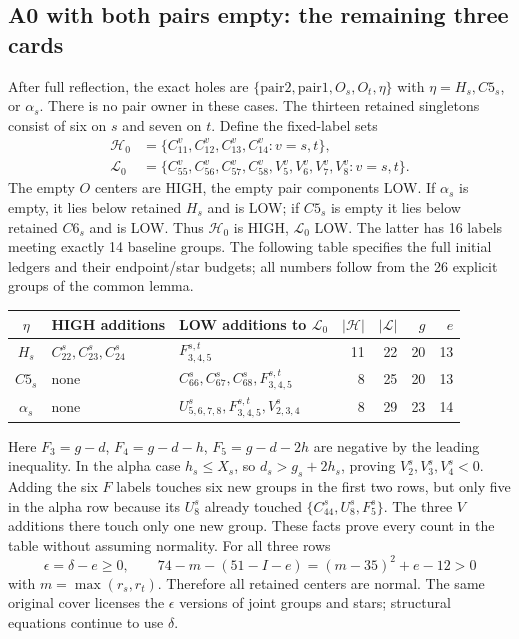 \documentclass[11pt,letterpaper]{article}
\theoremstyle{definition}\newtheorem{definition}[theorem]{Definition}
\begin{document}
\subsection{A0 with both pairs empty: the remaining three cards}
After full reflection, the exact holes are
$\{\mathrm{pair2},\mathrm{pair1},O_s,O_t,\eta\}$ with
$\eta=H_s,C5_s$, or $\alpha_s$. There is no pair owner in these cases.
The thirteen retained singletons consist of six on $s$ and seven on $t$.
Define the fixed-label sets
\[
\begin{split}
\mathcal H_0&=\{C_{11}^v,C_{12}^v,C_{13}^v,C_{14}^v:v=s,t\},\\
\mathcal L_0&=\{C_{55}^v,C_{56}^v,C_{57}^v,C_{58}^v,
                       V_5^v,V_6^v,V_7^v,V_8^v:v=s,t\}.
\end{split}
\]
The empty $O$ centers are HIGH, the empty pair components LOW.
If $\alpha_s$ is empty, it lies below retained $H_s$ and is LOW;
if $C5_s$ is empty it lies below retained $C6_s$ and is LOW.
Thus $\mathcal H_0$ is HIGH, $\mathcal L_0$ LOW. The latter has 16
labels meeting exactly 14 baseline groups. The following table specifies
the full initial ledgers and their endpoint/star budgets; all numbers
follow from the 26 explicit groups of the common lemma.
\begin{center}\small
\begin{tabular}{c|l|l|r r r r}
$\eta$&HIGH additions&LOW additions to $\mathcal L_0$&$|\mathcal H|$&$|\mathcal L|$&$g$&$e$\\\hline
$H_s$&$C_{22}^s,C_{23}^s,C_{24}^s$&$F_{3,4,5}^{s,t}$&11&22&20&13\\
$C5_s$&none&$C_{66}^s,C_{67}^s,C_{68}^s,F_{3,4,5}^{s,t}$&8&25&20&13\\
$\alpha_s$&none&$U_{5,6,7,8}^s,F_{3,4,5}^{s,t},V_{2,3,4}^s$&8&29&23&14
\end{tabular}
\end{center}
Here $F_3=g-d$, $F_4=g-d-h$, $F_5=g-d-2h$ are negative by the
leading inequality. In the alpha case $h_s\le X_s$, so
$d_s>g_s+2h_s$, proving $V_2^s,V_3^s,V_4^s<0$.
Adding the six $F$ labels touches six new groups in the first two rows,
but only five in the alpha row because its $U_8^s$ already touched
$\{C_{44}^s,U_8^s,F_5^s\}$. The three $V$ additions there touch
only one new group. These facts prove every count in the table without
assuming normality. For all three rows
\[
 \epsilon=\delta-e\ge0,\qquad
 74-m-(51-I-e)=(m-35)^2+e-12>0
\]
with $m=\max(r_s,r_t)$. Therefore all retained centers are normal.
The same original cover licenses the $\epsilon$ versions of joint groups
and stars; structural equations continue to use $\delta$.
\end{document}
